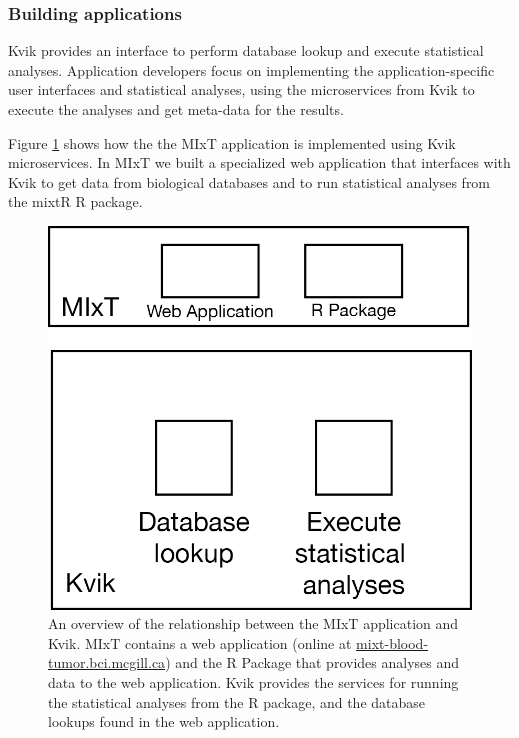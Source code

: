 \subsubsection*{Building applications} 
Kvik provides an interface to perform database lookup and execute statistical
analyses. Application developers focus on implementing the
application-specific user interfaces and statistical analyses, using the
microservices from Kvik to execute the analyses and get meta-data for the
results. 

Figure \ref{kvik-mixt} shows how the the MIxT application is implemented using Kvik microservices. In MIxT we built a
specialized web application that interfaces with Kvik to get data from
biological databases and to run statistical analyses from the mixtR R package. 

\begin{figure}[h!]
\centering
\includegraphics{figures/kvik-mixt.png}
\caption{An overview of the relationship between the MIxT application and Kvik.
MIxT contains a web application (online at \url{mixt-blood-tumor.bci.mcgill.ca})
and the R Package that provides analyses and data to the web application. Kvik
provides the services for running the statistical analyses from the R package,
and the database lookups found in the web application.} 
\label{kvik-mixt}
\end{figure} 

